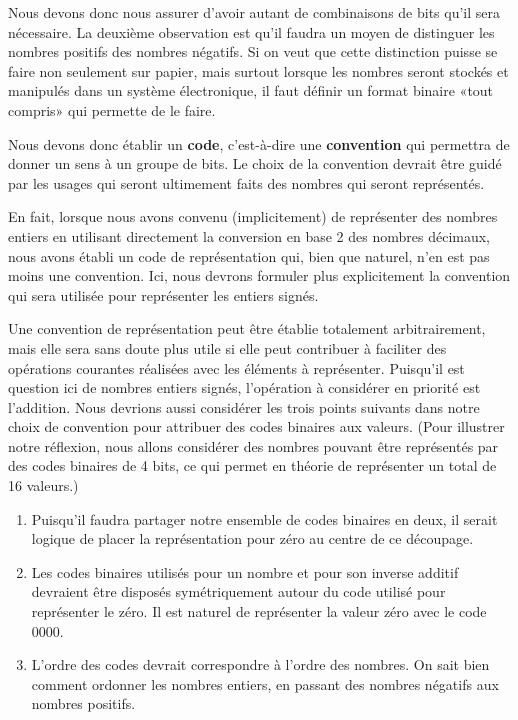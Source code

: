 \documentclass[letter, oneside]{book}
\begin{document}
Nous devons donc nous assurer d'avoir autant de combinaisons de bits
qu'il sera nécessaire. La deuxième observation est qu'il faudra un
moyen de distinguer les nombres positifs des nombres négatifs. Si on
veut que cette distinction puisse se faire non seulement sur papier,
mais surtout lorsque les nombres seront stockés et manipulés dans un
système électronique, il faut définir un format binaire «tout compris»
qui permette de le faire.

Nous devons donc établir un \textbf{code}, c'est-à-dire une \textbf{convention} qui
permettra de donner un sens à un groupe de bits. Le choix de la
convention devrait être guidé par les usages qui seront ultimement
faits des nombres qui seront représentés.

En fait, lorsque nous avons convenu (implicitement) de représenter des
nombres entiers en utilisant directement la conversion en base 2 des
nombres décimaux, nous avons établi un code de représentation qui,
bien que naturel, n'en est pas moins une convention. Ici, nous devrons
formuler plus explicitement la convention qui sera utilisée pour
représenter les entiers signés.

Une convention de représentation peut être établie totalement
arbitrairement, mais elle sera sans doute plus utile si elle peut
contribuer à faciliter des opérations courantes réalisées avec les
éléments à représenter. Puisqu'il est question ici de nombres entiers
signés, l'opération à considérer en priorité est l'addition. Nous devrions 
aussi considérer les trois points suivants dans notre choix de
convention pour attribuer des codes binaires aux valeurs. (Pour
illustrer notre réflexion, nous allons considérer des nombres pouvant
être représentés par des codes binaires de 4 bits, ce qui permet
en théorie de représenter un total de 16 valeurs.)

\begin{enumerate}
\item Puisqu'il faudra partager notre ensemble de codes binaires en deux,
il serait logique de placer la représentation pour zéro au centre
de ce découpage.

\item Les codes binaires utilisés pour un nombre et pour son inverse
additif devraient être disposés symétriquement autour du code
utilisé pour représenter le zéro. Il est naturel de représenter la
valeur zéro avec le code 0000.

\item L'ordre des codes devrait correspondre à l'ordre des nombres. On
sait bien comment ordonner les nombres entiers, en passant des
nombres négatifs aux nombres positifs.
\end{enumerate}
\end{document}
